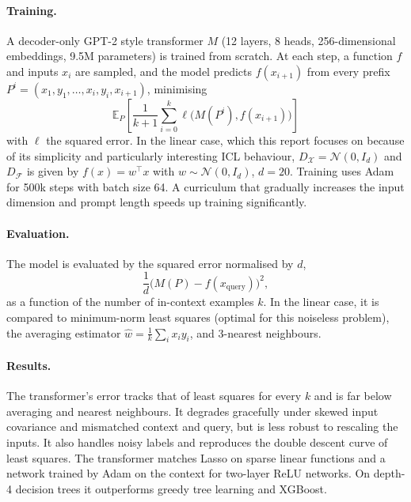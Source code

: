   \paragraph{Training.} A decoder-only GPT-2 style transformer $M$ (12 layers, 8 heads,
  256-dimensional embeddings, 9.5M parameters) is trained from scratch. At each step, a
  function $f$ and inputs $x_i$ are sampled, and the model predicts $f(x_{i+1})$ from every
  prefix $P^i = (x_1, y_1, \dots, x_i, y_i, x_{i+1})$, minimising
  \begin{equation}
    \mathbb{E}_P\!\left[\frac{1}{k+1}\sum_{i=0}^{k}
    \ell\big(M(P^i), f(x_{i+1})\big)\right]
    \label{objective}
  \end{equation}
  with $\ell$ the squared error. In the linear case, which this report focuses on because
  of its simplicity and particularly interesting ICL behaviour,
  $D_\mathcal{X} = \mathcal{N}(0, I_d)$ and $D_\mathcal{F}$ is given by $f(x) = w^\top x$
  with $w \sim \mathcal{N}(0, I_d)$, $d = 20$. Training uses Adam for 500k steps with batch
  size 64. A curriculum that gradually increases the input dimension and prompt length
  speeds up training significantly.

\vspace{-1em}
  \paragraph{Evaluation.} The model is evaluated by the squared error normalised by $d$,
  \begin{equation}
    \frac{1}{d}\big(M(P)-f(x_{\text{query}})\big)^2,
    \label{error}
  \end{equation}
  as a function of the number of in-context examples $k$. In the linear case, it is
  compared to minimum-norm least squares (optimal for this noiseless problem), the
  averaging estimator $\hat{w}=\frac1k\sum_i x_i y_i$, and 3-nearest neighbours.

  \paragraph{Results.} The transformer's error tracks that of least squares for every $k$
  and is far below averaging and nearest neighbours. It degrades gracefully under skewed
  input covariance and mismatched context and query, but is less robust to rescaling the
  inputs. It also handles noisy labels and reproduces the double descent curve of least
  squares. The transformer matches Lasso on sparse linear functions and a network trained
  by Adam on the context for two-layer ReLU networks. On depth-4 decision trees it
  outperforms greedy tree learning and XGBoost.